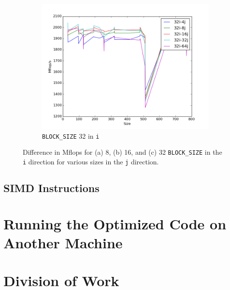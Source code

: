 \documentclass[10pt]{article}
\begin{document}
\begin{figure}[H]
\begin{subfigure}[b]{0.35\textwidth}
        \centering
        \includegraphics[width=\textwidth]{figures/32i-64j.png}
        \caption{{\tt BLOCK\_SIZE} 32 in {\tt i}}
        \end{subfigure}%
        \caption{Difference in Mflops for (a) 8, (b) 16, and (c) 32 {\tt BLOCK\_SIZE} in the {\tt i} direction for various sizes in the {\tt j} direction.}
        \label{fig:5}
\end{figure}

\subsection{SIMD Instructions} 

\section{Running the Optimized Code on Another Machine}

\section{Division of Work}
\end{document}
